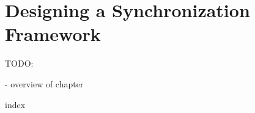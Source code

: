 
\chapter{Designing a Synchronization Framework}
\label{main}

TODO:

- overview of chapter




{index}